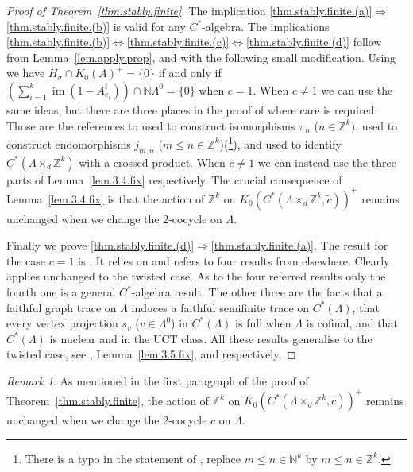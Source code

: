 \documentclass[a4paper, 12pt]{amsart}
\numberwithin{equation}{section}
\newcounter{theorem}
\theoremstyle{remark}
\newtheorem{remark}[theorem]{Remark}
\theoremstyle{definition}
\begin{document}
\begin{proof}[Proof of Theorem~\ref{thm.stably.finite}]
The implication \eqref{thm.stably.finite.(a)}$\Rightarrow$\eqref{thm.stably.finite.(b)} is valid for any
$C^*$-algebra. The implications \eqref{thm.stably.finite.(b)}$\Leftrightarrow$\eqref{thm.stably.finite.(c)}$\Leftrightarrow$\eqref{thm.stably.finite.(d)} follow from
Lemma~\ref{lem.apply.prop}, and \cite[Lemma~3.4]{MR3507995} with the following small modification.
Using \cite[Lemma~3.4]{MR3507995} we have $H_\sigma \cap K_0(A)^+ = \{0\}$ if and only if
$(\sum_{i=1}^k{\operatorname{im}}(1-A^t_{e_i})) \cap {\mathbb{N}}{\Lambda^0} = \{0\}$ when $c=1$. When $c\neq 1$ we
can use the same ideas, but there are three places in the proof of
\cite[Lemma~3.4]{MR3507995} where care is required. Those are the references
to \cite[Lemma~4.1]{MR3011251} used to construct isomorphisms $\pi_n$ ($n\in {\mathbb{Z}}^k$),
\cite[Theorem~4.2]{MR3011251} used to construct endomorphisms $j_{m,n}$ ($m\leq n\in
{\mathbb{Z}}^k$)(\footnote{There is a typo in the statement of \cite[Theorem~4.2]{MR3011251},
replace $m\leq n\in {\mathbb{N}}^k$ by $m\leq n\in {\mathbb{Z}}^k$.}), and \cite[Corollary 5.3]{MR3507995}
used to identify $C^*(\Lambda\times_d {\mathbb{Z}}^k)$ with a crossed product. When $c\neq 1$ we
can instead use the three parts of Lemma~\ref{lem.3.4.fix} respectively. The crucial
consequence of Lemma~\ref{lem.3.4.fix} is that the action of ${\mathbb{Z}}^k$ on
$K_0(C^*(\Lambda\times_d {\mathbb{Z}}^k,\tilde{c}))^+$ remains unchanged when we change the
2-cocycle on $\Lambda$.

Finally we prove \eqref{thm.stably.finite.(d)}$\Rightarrow$\eqref{thm.stably.finite.(a)}. The result for the case $c=1$ is
\cite[Theorem~3.7]{MR3507995}.  It relies on \cite[Lemma~2.1]{MR3507995} and refers to
four results from elsewhere. Clearly \cite[Lemma~2.1]{MR3507995} applies unchanged to the
twisted case. As to the four referred results only the fourth one is a general
$C^*$-algebra result. The other three are the facts that a faithful graph trace on
$\Lambda$ induces a faithful semifinite trace on $C^*(\Lambda)$, that every vertex
projection $s_v$ ($v\in \Lambda^0$) in $C^*(\Lambda)$ is full when $\Lambda$ is cofinal,
and that $C^*(\Lambda)$ is nuclear and in the UCT class. All these results generalise
to the twisted case, see \cite[Theorem~7.4]{MR3311883}, Lemma~\ref{lem.3.5.fix}, and
\cite[Corollary 8.7]{MR3335414} respectively.
\end{proof}

\begin{remark}\label{rem.action}
As mentioned in the first paragraph of the proof of Theorem~\ref{thm.stably.finite}, the
action of ${\mathbb{Z}}^k$ on $K_0(C^*(\Lambda\times_d {\mathbb{Z}}^k,\tilde{c}))^+$ remains unchanged when
we change the 2-cocycle $c$ on $\Lambda$.
\end{remark}
\end{document}
